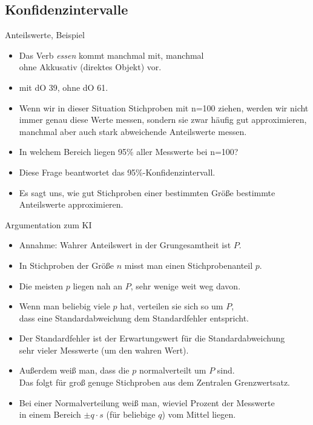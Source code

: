 \subsection{Konfidenzintervalle}



\begin{frame}
  {Anteilswerte, Beispiel}
  \begin{itemize}[<+->]
    \item Das Verb \textit{essen} kommt manchmal mit, manchmal\\
      ohne Akkusativ (direktes Objekt) vor.
    \item \alert{mit dO 39, ohne dO 61}.
    \item Wenn wir in dieser Situation Stichproben mit \alert{n=100} ziehen, werden wir nicht immer genau diese Werte messen, sondern sie zwar häufig gut approximieren, manchmal aber auch stark abweichende Anteilswerte messen.
    \item In welchem Bereich liegen 95\% aller Messwerte bei n=100?
    \item Diese Frage beantwortet das \alert{95\%-Konfidenzintervall}.
    \item Es sagt uns, wie gut Stichproben einer bestimmten Größe bestimmte Anteilswerte approximieren.
  \end{itemize}
\end{frame}

\begin{frame}
  {Argumentation zum KI}
  \begin{itemize}[<+->]
    \item Annahme: Wahrer \alert{Anteilswert in der Grungesamtheit} ist $P$.
    \item In \alert{Stichproben der Größe $n$} misst man einen \alert{Stichprobenanteil $p$}.
    \item Die meisten $p$ liegen nah an $P$, sehr wenige weit weg davon.
    \item Wenn man beliebig viele $p$ hat, verteilen sie sich so um $P$,\\
      dass eine Standardabweichung dem \alert{Standardfehler} entspricht.
    \item Der Standardfehler ist der Erwartungswert für die Standardabweichung\\
      sehr vieler Messwerte (um den wahren Wert).
    \item Außerdem weiß man, dass die \alert{$p$ normalverteilt um $P$} sind.\\
      Das folgt für groß genuge Stichproben aus dem \alert{Zentralen Grenzwertsatz}.
    \item Bei einer Normalverteilung weiß man, \alert{wieviel Prozent der Messwerte}\\
      \alert{in einem Bereich $\pm q\cdot s$} (für beliebige $q$) vom Mittel liegen.
  \end{itemize}
\end{frame}

